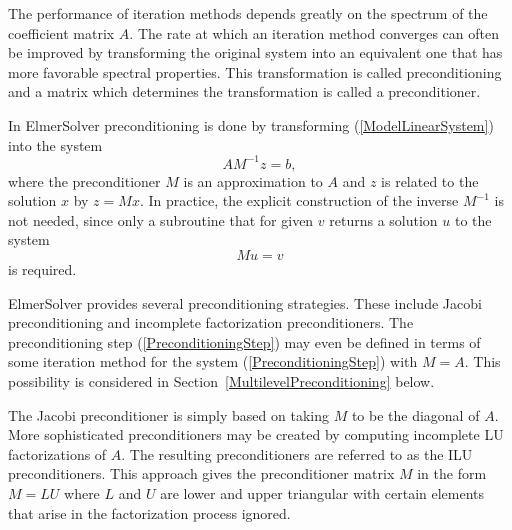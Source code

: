\begin{versiona}
The performance of iteration methods depends greatly on the spectrum
of the coefficient matrix $A$. The rate at which an iteration method converges
can often be improved by transforming the original system into an equivalent one 
that has more favorable spectral properties. This transformation is called
preconditioning and a matrix which determines the transformation is called 
a preconditioner.  

In ElmerSolver preconditioning is done by transforming (\ref{ModelLinearSystem}) 
into the system
\begin{equation}
AM^{-1} z = b,
\end{equation}
where the preconditioner $M$ is an approximation to $A$ and $z$ is related
to the solution $x$ by $z=Mx$. In practice, the explicit construction of the 
inverse $M^{-1}$ is not needed, since only a subroutine
that for given $v$ returns a solution $u$ to the system  
\begin{equation}\label{PreconditioningStep}
  M u = v
\end{equation}
is required.

ElmerSolver provides several preconditioning strategies.
These include Jacobi preconditioning and
incomplete factorization preconditioners. The preconditioning step
(\ref{PreconditioningStep}) may even be defined in terms of   
some iteration method for the system (\ref{PreconditioningStep}) with
$M=A$. This possibility is considered in Section~\ref{MultilevelPreconditioning} below. 


The Jacobi preconditioner is simply based on taking $M$ to be the diagonal of 
$A$. More sophisticated preconditioners may be created by
computing incomplete LU factorizations of $A$. The resulting preconditioners are referred 
to as the ILU preconditioners. This approach gives the 
preconditioner matrix $M$ in the form $M=LU$ where $L$ and $U$ are lower and upper 
triangular with certain elements that arise in the factorization process ignored. 


\end{versiona}
